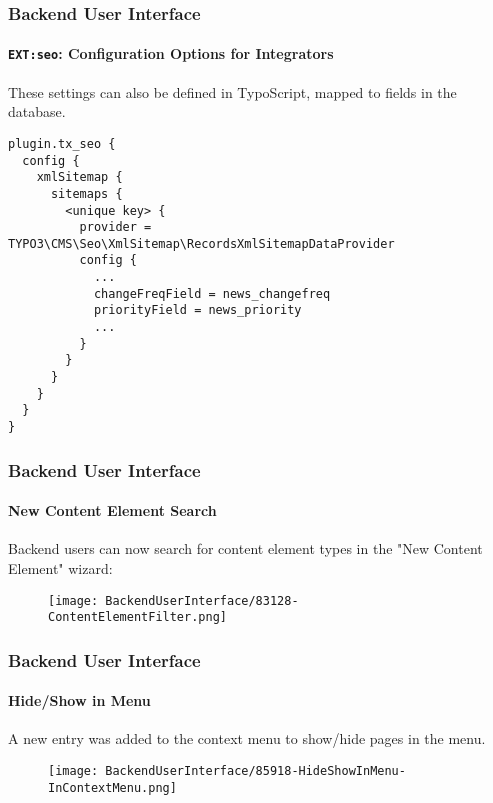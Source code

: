 
\begin{frame}[fragile]
	\frametitle{Backend User Interface}
	\framesubtitle{\texttt{EXT:seo}: Configuration Options for Integrators}

	\lstset{basicstyle=\tiny\ttfamily}

	These settings can also be defined in TypoScript, mapped to fields in the database.

	\begin{lstlisting}
plugin.tx_seo {
  config {
    xmlSitemap {
      sitemaps {
        <unique key> {
          provider = TYPO3\CMS\Seo\XmlSitemap\RecordsXmlSitemapDataProvider
          config {
            ...
            changeFreqField = news_changefreq
            priorityField = news_priority
            ...
          }
        }
      }
    }
  }
}
	\end{lstlisting}

\end{frame}


\begin{frame}[fragile]
	\frametitle{Backend User Interface}
	\framesubtitle{New Content Element Search}

	Backend users can now search for content element types in the "New Content Element" wizard:

	\begin{figure}
		\texttt{[image: BackendUserInterface/83128-ContentElementFilter.png]}
	\end{figure}

\end{frame}


\begin{frame}[fragile]
	\frametitle{Backend User Interface}
	\framesubtitle{Hide/Show in Menu}

	A new entry was added to the context menu to show/hide pages in the menu.

	\begin{figure}
		\texttt{[image: BackendUserInterface/85918-HideShowInMenu-InContextMenu.png]}
	\end{figure}

\end{frame}

